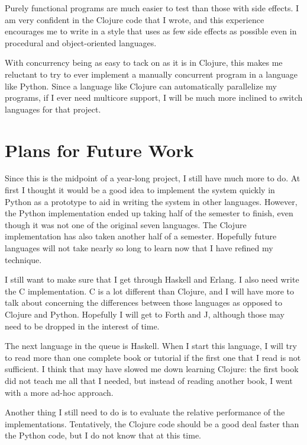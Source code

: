 \documentclass{article}
\begin{document}
Purely functional programs are much easier to test than those with side effects.
I am very confident in the Clojure code that I wrote, and this experience
encourages me to write in a style that uses as few side effects as possible
even in procedural and object-oriented languages.

With concurrency being as easy to tack on as it is in Clojure, this makes me
reluctant to try to ever implement a manually concurrent program in a language
like Python.  Since a language like Clojure can automatically parallelize my
programs, if I ever need multicore support, I will be much more inclined to
switch languages for that project.

\section{Plans for Future Work}

Since this is the midpoint of a year-long project, I still have much more
to do.  At first I thought it would be a good idea to implement the system
quickly in Python as a prototype to aid in writing the system in other
languages.  However, the Python implementation ended up taking half of the
semester to finish, even though it was not one of the original seven languages.
The Clojure implementation has also taken another half of a semester.
Hopefully future languages will not take nearly so long to learn now that I
have refined my technique.

I still want to make sure that I get through Haskell and Erlang.  I also need
write the C implementation.  C is a lot different than Clojure, and I will have
more to talk about concerning the differences between those languages as opposed
to Clojure and Python.  Hopefully I will get to Forth and J, although those may
need to be dropped in the interest of time.

The next language in the queue is Haskell.  When I start this language, I will
try to read more than one complete book or tutorial if the first one that I
read is not sufficient.  I think that may have slowed me down learning Clojure:
the first book did not teach me all that I needed, but instead of reading
another book, I went with a more ad-hoc approach.

Another thing I still need to do is to evaluate the relative performance of
the implementations.  Tentatively, the Clojure code should be a good deal
faster than the Python code, but I do not know that at this time.



\end{document}
